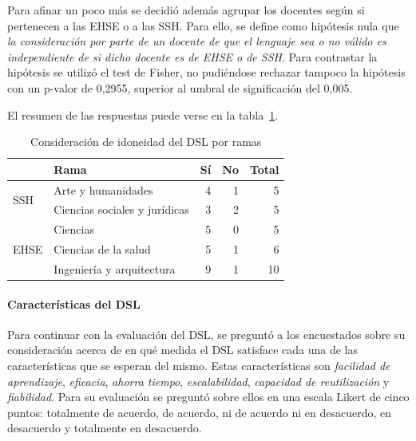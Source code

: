 Para afinar un poco más se decidió además agrupar los docentes según si pertenecen a las EHSE o a  las SSH. Para ello, se define como hipótesis nula que \emph{la consideración por parte de un docente de que el lenguaje sea o no válido es independiente de si  dicho docente es de EHSE o de SSH}. Para contrastar la hipótesis se utilizó el test de Fisher, no pudiéndose rechazar tampoco la hipótesis con un p-valor de 0,2955, superior al umbral de significación del 0,005.

El resumen de las respuestas puede verse en la tabla~\ref{tab:cap:encuesta:DSL:rama}.

\begin{table}
  \begin{center}
  \begin{tabular}{| l | l | r | r | r |}
    \hline
    & Rama & Sí & No & Total \\
    \hline
    \hline
    \multirow{2}{2.5cm}{SSH} & Arte y humanidades & 4 & 1 & 5  \\
    \cline{2-5}
    & Ciencias sociales y jurídicas & 3 & 2 & 5  \\
    \hline
    \multirow{3}{2.5cm}{EHSE} & Ciencias & 5 & 0 & 5  \\
    \cline{2-5}
    & Ciencias de la salud & 5 & 1 & 6  \\
    \cline{2-5}
    & Ingeniería y arquitectura & 9 & 1 & 10 \\
    \hline
  \end{tabular}
\end{center}
\caption{Consideración de idoneidad del DSL por ramas}
\label{tab:cap:encuesta:DSL:rama}
\end{table}

\paragraph*{Características del DSL}

Para continuar con la evaluación del DSL, se preguntó a los encuestados sobre su consideración acerca de en qué medida el DSL satisface cada una de las características que se esperan del mismo. Estas características son \emph{facilidad de aprendizaje}, \emph{eficacia}, \emph{ahorra tiempo}, \emph{escalabilidad}, \emph{capacidad de reutilización} y \emph{fiabilidad}. Para su evaluación se preguntó sobre ellos en una escala Likert de cinco puntos: totalmente de acuerdo, de acuerdo, ni de acuerdo ni en desacuerdo, en desacuerdo y totalmente en desacuerdo. 

